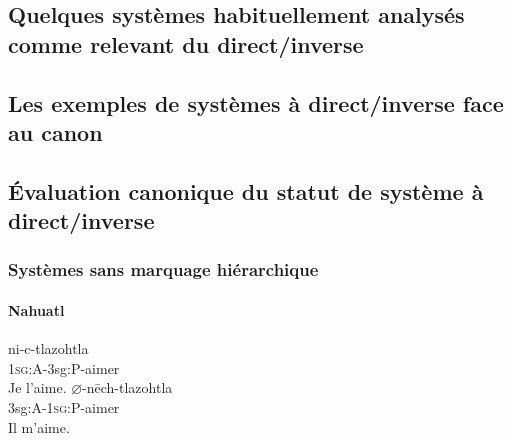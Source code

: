 \subsection[Exemples de direct/inverse]{Quelques systèmes habituellement analysés comme relevant du direct/inverse}


\subsection[Décalages par rapport au canon]{Les exemples de systèmes à direct/inverse face au canon}

\subsection[Évaluation du direct/inverse]{Évaluation canonique du statut de système à direct/inverse}
\begin{frame}
\frametitle{Systèmes sans marquage hiérarchique}
\framesubtitle{Nahuatl}
\begin{exe}
\ex
\glt ni-c-tlazohtla \\
1\textsc{sg}:A-3sg:P-aimer \\
\gll Je l'aime.
\ex
\glt $\varnothing$-nēch-tlazohtla \\
3sg:A-1\textsc{sg}:P-aimer \\
\gll Il m'aime.
\end{exe}
\end{frame}


